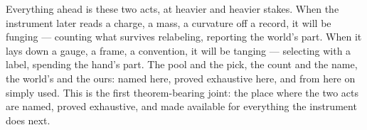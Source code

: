 Everything ahead is these two acts, at heavier and heavier stakes. When the instrument later reads a charge, a
mass, a curvature off a record, it will be funging --- counting what survives relabeling, reporting the world's
part. When it lays down a gauge, a frame, a convention, it will be tanging --- selecting with a label, spending
the hand's part. The pool and the pick, the count and the name, the world's and the ours: named here, proved
exhaustive here, and from here on simply used. This is the first theorem-bearing joint: the place where the two
acts are named, proved exhaustive, and made available for everything the instrument does next.
